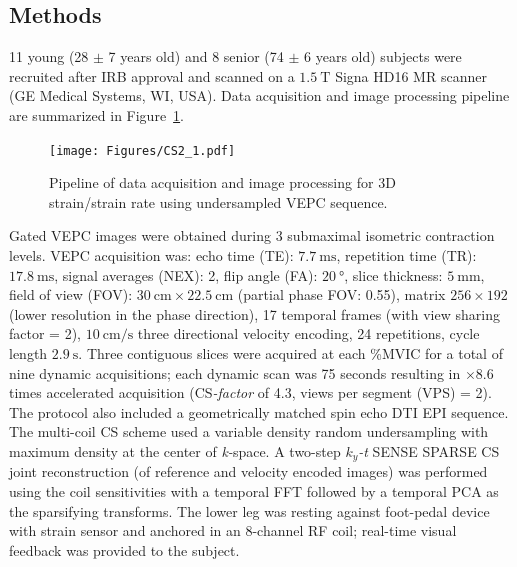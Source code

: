 \subsection{Methods}
11 young (28 $\pm$ 7 years old) and 8 senior (74 $\pm$ 6 years old) subjects were recruited after IRB approval and scanned on a $\SI{1.5}{\tesla}$ Signa HD16 MR scanner (GE Medical Systems, WI, USA).
Data acquisition and image processing pipeline are summarized in Figure~\ref{fig: CSYO1}.
\begin{figure}
\vspace{+0.2cm}
\centering
\texttt{[image: Figures/CS2\_1.pdf]}
\caption[Pipeline of data acquisition and image processing for 3D strain/strain rate using undersampled VEPC sequence]{Pipeline of data acquisition and image processing for 3D strain/strain rate using undersampled VEPC sequence.}
\label{fig: CSYO1}
\end{figure}
Gated VEPC images were obtained during 3 submaximal isometric contraction levels.
VEPC acquisition was: echo time (TE): $\SI{7.7}{\milli\second}$, repetition time (TR): $\SI{17.8}{\milli\second}$, signal averages (NEX): 2, flip angle (FA): $\SI{20}{\degree}$, slice thickness: $\SI{5}{\milli\meter}$, field of view (FOV): $\SI{30}{\centi\meter} \times \SI{22.5}{\centi\meter}$ (partial phase FOV: 0.55), matrix $256 \times 192$ (lower resolution in the phase direction), 17 temporal frames (with view sharing factor = 2), $\SI{10}{\centi\meter/\second}$ three directional velocity encoding, 24 repetitions, cycle length $\SI{2.9}{\second}$.
Three contiguous slices were acquired at each \%MVIC for a total of nine dynamic acquisitions; each dynamic scan was 75 seconds resulting in $\times 8.6$ times accelerated acquisition (\mbox{CS\textit{-factor}} of 4.3, views per segment (VPS) = 2). 
The protocol also included a geometrically matched spin echo DTI EPI sequence.
The multi-coil CS scheme used a variable density random undersampling with maximum density at the center of \mbox{\textit{k-}space}. 
A two-step $k_y$\textit{-t} SENSE SPARSE CS joint reconstruction (of reference and velocity encoded images) was performed~\cite{RNCS10} using the coil sensitivities with a temporal FFT followed by a temporal PCA as the sparsifying transforms. 
The lower leg was resting against foot-pedal device~\cite{RNSS10} with strain sensor and anchored in an 8-channel RF coil; real-time visual feedback was provided to the subject. 
